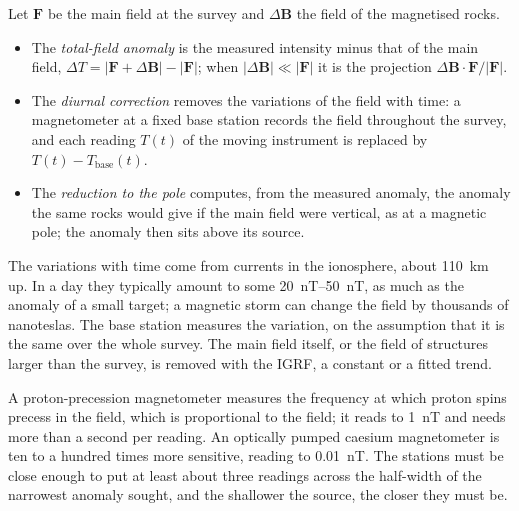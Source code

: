 \begin{definition}\label{def:b3:field-lab-methods-3:magnetic}
Let $\mathbf{F}$ be the main field at the survey and $\Delta\mathbf{B}$
the field of the magnetised rocks.
\begin{itemize}
  \item The \emph{total-field anomaly} is
        the measured intensity minus that of the main field, $\Delta T =
        |\mathbf{F} + \Delta\mathbf{B}| - |\mathbf{F}|$; when
        $|\Delta\mathbf{B}| \ll |\mathbf{F}|$ it is the projection
        $\Delta\mathbf{B}\cdot\mathbf{F}/|\mathbf{F}|$.
  \item The \emph{diurnal correction} removes
        the variations of the field with time: a magnetometer at a fixed
        base station records the field throughout the survey, and each
        reading $T(t)$ of the moving instrument is replaced by $T(t) -
        T_\mathrm{base}(t)$.
  \item The \emph{reduction to the pole}
        computes, from the measured anomaly, the anomaly the same rocks
        would give if the main field were vertical, as at a magnetic
        pole; the anomaly then sits above its source.
\end{itemize}
\end{definition}

The variations with time come from currents in the ionosphere, about
\qty{110}{km} up. In a day they typically amount to some
\qtyrange{20}{50}{nT}, as much as the anomaly of a small target; a
magnetic storm can change the field by thousands of nanoteslas. The
base station measures the variation, on the assumption that it is the
same over the whole survey. The main field itself, or the field of
structures larger than the survey, is removed with the IGRF, a constant
or a fitted trend.

A proton-precession magnetometer measures the frequency at which proton
spins precess in the field, which is proportional to the field; it
reads to \qty{1}{nT} and needs more than a second per reading. An
optically pumped caesium magnetometer is ten to a hundred times more
sensitive, reading to \qty{0.01}{nT}. The stations must be close enough
to put at least about three readings across the half-width of the
narrowest anomaly sought, and the shallower the source, the closer they
must be.

